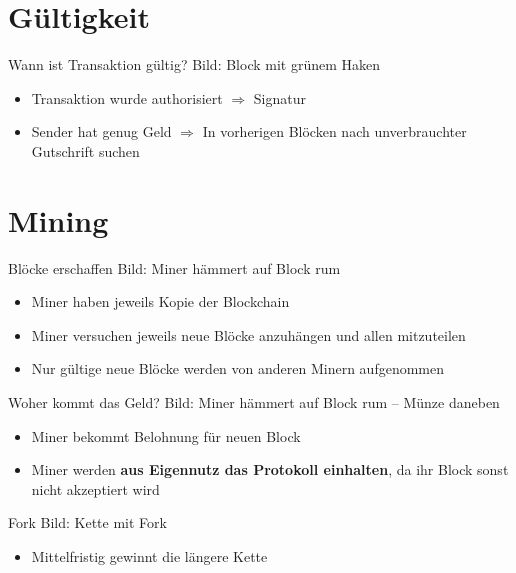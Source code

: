 \documentclass[aspectratio=169]{beamer}
\begin{document}
\section{Gültigkeit}

\begin{frame}{Wann ist Transaktion gültig?}
    Bild: Block mit grünem Haken
    \begin{itemize}
        \item Transaktion wurde authorisiert $\Rightarrow$ Signatur
        \item Sender hat genug Geld $\Rightarrow$ In vorherigen Blöcken nach unverbrauchter Gutschrift suchen
    \end{itemize}
\end{frame}





\section{Mining}

\begin{frame}{Blöcke erschaffen}
    Bild: Miner hämmert auf Block rum
    \begin{itemize}
        \item Miner haben jeweils Kopie der Blockchain
        \item Miner versuchen jeweils neue Blöcke anzuhängen und allen mitzuteilen
        \item Nur gültige neue Blöcke werden von anderen Minern aufgenommen
    \end{itemize}
\end{frame}


\begin{frame}{Woher kommt das Geld?}
    Bild: Miner hämmert auf Block rum -- Münze daneben
    \begin{itemize}
        \item Miner bekommt Belohnung für neuen Block
        \item Miner werden \textbf{aus Eigennutz das Protokoll einhalten}, da ihr Block sonst nicht akzeptiert wird
    \end{itemize}
\end{frame}


\begin{frame}{Fork}
    Bild: Kette mit Fork
    \begin{itemize}
        \item Mittelfristig gewinnt die längere Kette
    \end{itemize}
\end{frame}
\end{document}
